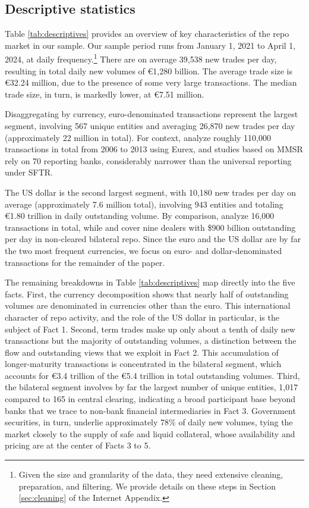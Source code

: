 \documentclass[english, 12pt, oneside]{article}
\begin{document}

\subsection{Descriptive statistics}

Table \ref{tab:descriptives} provides an overview of key characteristics of the repo market in our sample.
Our sample period runs from January 1, 2021 to April 1, 2024, at daily frequency.\footnote{Given the size and granularity of the data, they need extensive cleaning, preparation, and filtering. We provide details on these steps in Section \ref{sec:cleaning} of the Internet Appendix.} There are on average 39,538 new trades per day, resulting in total daily new volumes of \euro 1,280 billion. The average trade size is \euro 32.24 million, due to the presence of some very large transactions. The median trade size, in turn, is markedly lower, at \euro 7.51 million.

Disaggregating by currency, euro-denominated transactions represent the largest segment, involving 567 unique entities and averaging 26,870 new trades per day (approximately 22 million in total). For context, \citet{mancini2016} analyze roughly 110,000 transactions in total from 2006 to 2013 using Eurex, and studies based on MMSR \citep[e.g.][]{greppmair2023, carrera2024} rely on 70 reporting banks, considerably narrower than the universal reporting under SFTR.

The US dollar is the second largest segment, with 10,180 new trades per day on average (approximately 7.6 million total), involving 943 entities and totaling \euro 1.80 trillion in daily outstanding volume. By comparison, \citet{krishnamurthy2014} analyze 16,000 transactions in total, while \citet{hempel2023} and \citet{baklanova2019} cover nine dealers with \$900 billion outstanding per day in non-cleared bilateral repo. Since the euro and the US dollar are by far the two most frequent currencies, we focus on euro- and dollar-denominated transactions for the remainder of the paper.

The remaining breakdowns in Table \ref{tab:descriptives} map directly into the five facts. First, the currency decomposition shows that nearly half of outstanding volumes are denominated in currencies other than the euro. This international character of repo activity, and the role of the US dollar in particular, is the subject of Fact 1. Second, term trades make up only about a tenth of daily new transactions but the majority of outstanding volumes, a distinction between the flow and outstanding views that we exploit in Fact 2. This accumulation of longer-maturity transactions is concentrated in the bilateral segment, which accounts for \euro 3.4 trillion of the \euro 5.4 trillion in total outstanding volumes. Third, the bilateral segment involves by far the largest number of unique entities, 1,017 compared to 165 in central clearing, indicating a broad participant base beyond banks that we trace to non-bank financial intermediaries in Fact 3. Government securities, in turn, underlie approximately 78\% of daily new volumes, tying the market closely to the supply of safe and liquid collateral, whose availability and pricing are at the center of Facts 3 to 5.
\end{document}
